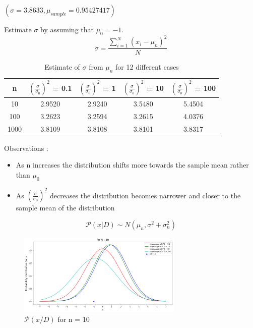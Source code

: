 \documentclass[a4 paper]{article}
\begin{document}

$(\sigma = 3.8633 , \mu_{sample} = 0.95427417)$

 Estimate $\sigma$ by assuming that $\mu_0 = -1$. \\
\begin{equation}
    \sigma = \frac{\sum_{i=1}^{N}(x_i-\mu_n)^2}{N}
\end{equation}
\begin{table}[h!]
\centering
 \begin{tabular}{|c|c|c|c|c|} 
 \hline
 n & $(\frac{\sigma}{\sigma_0})^2$ = 0.1 & $(\frac{\sigma}{\sigma_0})^2$ = 1 & $(\frac{\sigma}{\sigma_0})^2$ = 10 & $(\frac{\sigma}{\sigma_0})^2$ = 100 \\ [0.5ex] 
 \hline
10	& 2.9520 &  2.9240 & 3.5480 & 5.4504\\
100	& 3.2623 &  3.2594 & 3.2615 & 4.0376\\
1000 & 3.8109 &  3.8108 & 3.8101 & 3.8317\\

\hline
\end{tabular}
\caption{Estimate of $\sigma$ from $\mu_n$ for 12 different cases }
\end{table}

Observations :
\begin{itemize}
\item As n increases the distribution shifts more towards the sample mean rather than $\mu_0$
\item As $(\frac{\sigma}{\sigma_0})^2$ decreases the distribution becomes narrower and closer to the sample mean of the distribution
\end{itemize}

\newpage
\begin{equation}
    \mathcal{P}(x|D) \sim N(\mu_n, \sigma^2 + \sigma_n^2) 
\end{equation}
\begin{figure}[!htb]
    \centering
    \includegraphics[width=0.7\textwidth]{gaussian(n=10).png}
    \caption{$\mathcal{P}(x/D)$ for n = 10}
    \label{fig:1}
\end{figure}
\end{document}
